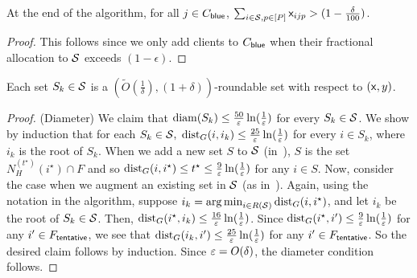 \begin{claim}
		At the end of the algorithm, for all $j \in C_{\mathsf{blue}}$, $\sum_{i \in {\cal S}, p \in [P]} {\mathsf x}_{ijp} > (1-\frac{\delta}{100})$.	
\end{claim}
\begin{proof}
This follows since we only add clients to $C_{\mathsf{blue}}$ when their fractional allocation to ${\cal S}$ exceeds $(1-\epsilon)$.
\end{proof}



\begin{lemma}
\label{flem:sk}
Each set $S_k \in {\cal S}$ is a $\left(\tilde{O}\left(\frac{1}{\delta}\right),(1+\delta)\right)$-roundable set with respect to $({\mathsf x},y)$.
\end{lemma}
\begin{proof}
(Diameter) We claim that $\mathrm{diam}(S_k) \leq \frac{50}{\varepsilon}\ln(\frac{1}{\varepsilon})$ for every $S_k \in {\cal S}$. We show by induction that for each $S_k \in {\cal S},$
$\mathrm{dist}_G(i,i_k) \leq \frac{25}{\varepsilon}\ln(\frac{1}{\varepsilon})$ for every $i \in S_k$, where $i_k$ is the root of $S_k$. When we add a new set $S$ to ${\cal S}$ (in~),
$S$ is the set $N^{(t^\star)}_H(i^\star)\cap F$ and so $\mathrm{dist}_G(i,i^\star) \leq t^\star \leq \frac{9}{\varepsilon}\ln(\frac{1}{\varepsilon})$ %
for any $i \in S$. Now, consider the case when we augment an existing set  in $\cal S$ (as in~).
Again, using the notation in the algorithm, suppose $i_k = \operatorname*{arg\,min}_{i \in R({\cal S})} \mathrm{dist}_G(i, i^\star)$, and let $i_k$ be the
root of $S_k \in {\cal S}$. Then, $\mathrm{dist}_G(i^\star, i_k) \leq \frac{16}{\varepsilon}\ln(\frac{1}{\varepsilon})$. Since $\mathrm{dist}_G(i^\star, i') \leq \frac{9}{\varepsilon}\ln(\frac{1}{\varepsilon})$ for any $i' \in F_\mathsf{tentative}$, we see that
$\mathrm{dist}_G(i_k, i') \leq \frac{25}{\varepsilon}\ln(\frac{1}{\varepsilon})$ for any $i' \in F_\mathsf{tentative}$.
So the desired claim follows by induction. Since $\varepsilon = O(\delta)$, the diameter condition follows.
\smallskip


\end{proof}
